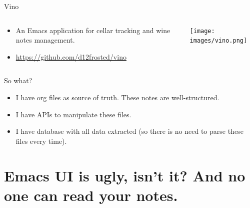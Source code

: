 \documentclass[presentation,aspectratio=169,smaller]{beamer}
\begin{document}
\begin{frame}[label={sec:org998a34d}]{Vino}
\begin{columns}
\begin{column}{0.75\columnwidth}
\begin{itemize}
\item An Emacs application for cellar tracking and wine notes management.
\item \url{https://github.com/d12frosted/vino}
\end{itemize}
\end{column}
\begin{column}{0.25\columnwidth}
\begin{center}
\texttt{[image: images/vino.png]}
\end{center}
\end{column}
\end{columns}
\end{frame}
\begin{frame}[label={sec:orge1733a3}]{So what?}
\begin{itemize}
\item I have org files as source of truth. These notes are \alert{well-structured}.
\item I have APIs to manipulate these files.
\item I have database with all data extracted (so there is no need to parse these files every time).
\end{itemize}
\end{frame}
\section{Emacs UI is ugly, isn't it? And no one can read your notes.}
\label{sec:orgf117d86}
\end{document}
